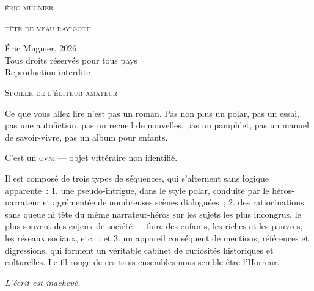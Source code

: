 \documentclass[12pt,twoside,openright]{memoir}
\makeatletter
\renewcommand{\cleardoublepage}{%
  \clearpage
  \if@twoside
    \ifodd\c@page\else
      \hbox{}\thispagestyle{empty}\newpage
    \fi
  \fi
}
\makeatother
\begin{document}
\pagestyle{empty}

\begin{center}
\vspace*{6\onelineskip}
{\scshape\large éric mugnier}

\vspace{8\onelineskip}
{\scshape\huge tête de veau ravigote}

\vspace{2\onelineskip}

\end{center}
\newpage
\thispagestyle{empty}
\vspace*{\fill}
{\footnotesize\noindent
\textcopyright{} Éric Mugnier, 2026\\
Tous droits réservés pour tous pays\\
Reproduction interdite
}
\newpage

\thispagestyle{empty}
\vspace*{4\onelineskip}
{\centering\normalfont\scshape\large Spoiler de l'éditeur amateur\par}
\vspace{2\onelineskip}

\noindent Ce que vous allez lire n'est pas un roman. Pas non plus un polar, pas un essai, pas une autofiction, pas un recueil de nouvelles, pas un pamphlet, pas un manuel de savoir-vivre, pas un album pour enfants.

\medskip
\noindent C'est un \textsc{ovni} — objet vittéraire non identifié.

\medskip
\noindent Il est composé de trois types de séquences, qui s'alternent sans logique apparente~: 1. une pseudo-intrigue, dans le style polar, conduite par le héros-narrateur et agrémentée de nombreuses scènes dialoguées~; 2. des ratiocinations sans queue ni tête du même narrateur-héros sur les sujets les plus incongrus, le plus souvent des enjeux de société — faire des enfants, les riches et les pauvres, les réseaux sociaux, etc.~; et 3. un appareil conséquent de mentions, références et digressions, qui forment un véritable cabinet de curiosités historiques et culturelles. Le fil rouge de ces trois ensembles nous semble être l'Horreur.

\medskip
\noindent \textit{L'écrit est inachevé.}
\end{document}
